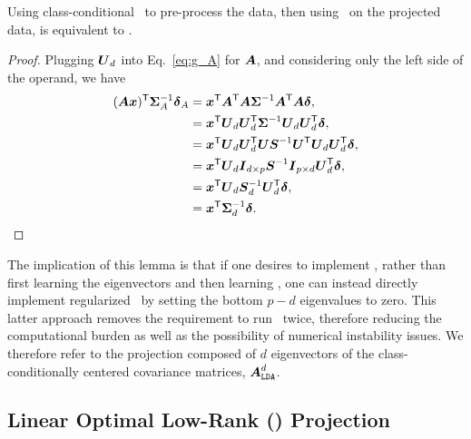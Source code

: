 \documentclass[11pt]{extarticle}
\begin{document}


\begin{lem}
Using class-conditional \Pca~to pre-process the data, then using \Lda~on the projected data, is equivalent to \Rrlda. %
\end{lem}

\begin{proof}
Plugging $\bU_d$ into Eq.~\eqref{eq:g_A} for $\bA$, and considering only the left side of the operand, we have
\begin{align*}
(\bA \bx)\TT \bSig^{-1}_A \bdel_A &= \bx\TT \bA\TT \bA \bSig^{-1} \bA\TT \bA \bdel,
\\&= \bx\TT  \bU_d\bU_d\TT \bSig^{-1} \bU_d\bU_d\TT \bdel,
\\&= \bx\TT  \bU_d \bU_d\TT \bU \bS^{-1} \bU\TT \bU_d\bU_d\TT \bdel,
\\&= \bx\TT  \bU_d \bI_{d \times p} \bS^{-1} \bI_{p \times d} \bU_d\TT \bdel,
\\&= \bx\TT  \bU_d \bS^{-1}_d  \bU_d\TT \bdel ,
\\&= \bx\TT  \bSig^{-1}_d  \bdel.
\end{align*}
\end{proof}

The implication of this lemma is that if one desires to implement \Rrlda, rather than first learning the eigenvectors and then learning \Lda, one can instead directly implement regularized \Lda~by setting the bottom $p-d$ eigenvalues to zero.  This latter approach removes the requirement to run \Svd~twice, therefore reducing the computational burden as well as the possibility of numerical instability issues. We therefore refer to the projection composed of $d$  eigenvectors of the class-conditionally centered covariance matrices, $\bA_{\Lda}^d$.




\subsection[LOL]{Linear Optimal Low-Rank (\Lol) Projection}
\end{document}
